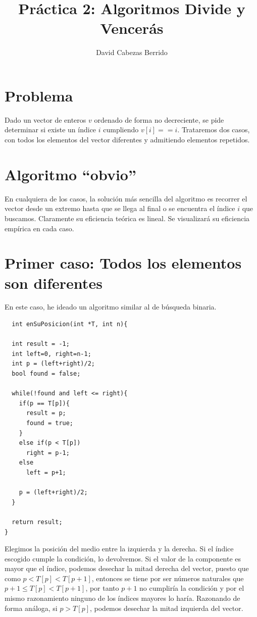 \documentclass[a4]{article}
\author{David Cabezas Berrido}
\date{\vspace{-5mm}}
\title{\huge Práctica 2: Algoritmos Divide y Vencerás \HRule\vspace{-4mm}}
\begin{document}
\maketitle
\vspace{20mm}
\tableofcontents
\newpage

\section{Problema}
Dado un vector de enteros $v$ ordenado de forma no decreciente, se
pide determinar si existe un índice $i$ cumpliendo
$v[i]==i$. Trataremos dos casos, con todos los elementos del vector
diferentes y admitiendo elementos repetidos.

\section{Algoritmo ``obvio''}
En cualquiera de los casos, la solución más sencilla del algoritmo es
recorrer el vector desde un extremo hasta que se llega al final o se
encuentra el índice $i$ que buscamos. Claramente su eficiencia teórica
es lineal. Se visualizará su eficiencia empírica en cada caso.

\section{Primer caso: Todos los elementos son diferentes}
En este caso, he ideado un algoritmo similar al de búsqueda binaria.

\begin{lstlisting}
  int enSuPosicion(int *T, int n){
  
  int result = -1;
  int left=0, right=n-1;
  int p = (left+right)/2;
  bool found = false;
  
  while(!found and left <= right){
    if(p == T[p]){
      result = p;
      found = true;
    }
    else if(p < T[p])
      right = p-1;
    else
      left = p+1;

    p = (left+right)/2;
  }

  return result;
}
\end{lstlisting}

Elegimos la posición del medio entre la izquierda y la derecha.  Si
el índice escogido cumple la condición, lo devolvemos. Si el valor
de la componente es mayor que el índice, podemos desechar la mitad
derecha del vector, puesto que como $p < T[p] < T[p+1]$, entonces se
tiene por ser números naturales que $p+1 \leq T[p] < T[p+1]$, por
tanto $p+1$ no cumpliría la condición y por el mismo razonamiento
ninguno de los índices mayores lo haría. Razonando de forma análoga,
si $p > T[p]$, podemos desechar la mitad izquierda del vector.
\end{document}
